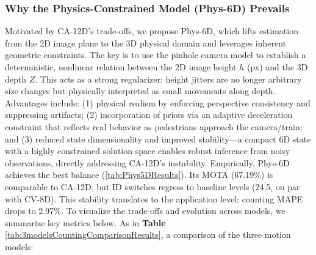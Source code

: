 \subsubsection{Why the Physics-Constrained Model (Phys-6D) Prevails}

Motivated by CA-12D’s trade-offs, we propose Phys-6D, which lifts estimation from the 2D image plane to the 3D physical domain and leverages inherent geometric constraints.
The key is to use the pinhole camera model to establish a deterministic, nonlinear relation between the 2D image height $h$ (px) and the 3D depth $Z$. This acts as a strong regularizer: height jitters are no longer arbitrary size changes but physically interpreted as small movements along depth. Advantages include: (1) physical realism by enforcing perspective consistency and suppressing artifacts; (2) incorporation of priors via an adaptive deceleration constraint that reflects real behavior as pedestrians approach the camera/train; and (3) reduced state dimensionality and improved stability—a compact 6D state with a highly constrained solution space enables robust inference from noisy observations, directly addressing CA-12D’s instability.
Empirically, Phys-6D achieves the best balance (\ref{tab:Phys5DResults}). Its MOTA (67.19\%) is comparable to CA-12D, but ID switches regress to baseline levels (24.5, on par with CV-8D). This stability translates to the application level: counting MAPE drops to 2.97\%.
To visualize the trade-offs and evolution across models, we summarize key metrics below.
As in \textbf{Table} \ref{tab:3modelsCountingComparisonResults}, a comparison of the three motion models:

\begin{table}[H]
    \centering
    \caption{Counting Performance Comparison of the Three Models}
    \label{tab:3modelsCountingComparisonResults}
\end{table}

